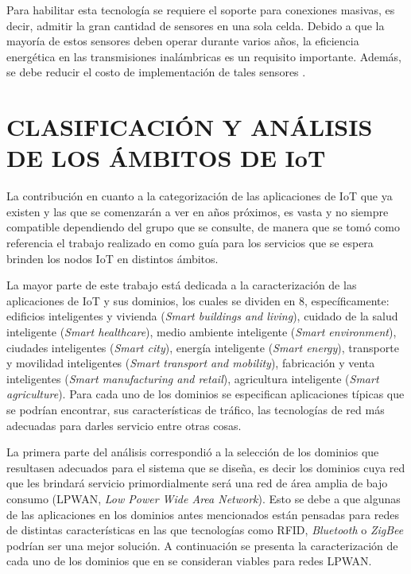 Para habilitar esta tecnología se requiere el soporte para conexiones masivas, es decir, admitir la gran cantidad de sensores en una sola celda. Debido a que la mayoría de estos sensores deben operar durante varios años, la eficiencia energética en las transmisiones inalámbricas es un requisito importante. Además, se debe reducir el costo de implementación de tales sensores \parencite{IoT5GWire}.


\section{CLASIFICACIÓN Y ANÁLISIS DE LOS ÁMBITOS DE IoT}

La contribución en cuanto a la categorización de las aplicaciones de IoT que ya existen y las que se comenzarán a ver en años próximos, es vasta y no siempre compatible dependiendo del grupo que se consulte, de manera que se tomó como referencia el trabajo realizado en \parencite{NetTrafficIoT} como guía para los servicios que se espera brinden los nodos IoT en distintos ámbitos.\newline

La mayor parte de este trabajo está dedicada a la caracterización de las aplicaciones de IoT y sus dominios, los cuales se dividen en 8, específicamente: edificios inteligentes y vivienda (\textit{Smart buildings and living}), cuidado de la salud inteligente (\textit{Smart healthcare}), medio ambiente inteligente (\textit{Smart environment}), ciudades inteligentes (\textit{Smart city}), energía inteligente (\textit{Smart energy}), transporte y movilidad  inteligentes (\textit{Smart transport and mobility}), fabricación y venta inteligentes (\textit{Smart manufacturing and retail}), agricultura inteligente (\textit{Smart agriculture}). Para cada uno de los dominios se especifican aplicaciones típicas que se podrían encontrar, sus características de tráfico, las tecnologías de red más adecuadas para darles servicio entre otras cosas.\newline

La primera parte del análisis correspondió a la selección de los dominios que resultasen adecuados para el sistema que se diseña, es decir los dominios cuya red que les brindará servicio primordialmente será una red de área amplia de bajo consumo (LPWAN, \textit{Low Power Wide Area Network}). Esto se debe a que algunas de las aplicaciones en los dominios antes mencionados están pensadas para redes de distintas características en las que tecnologías como RFID, \textit{Bluetooth }o \textit{ZigBee }podrían ser una mejor solución. A continuación se presenta la caracterización de cada uno de los dominios que en \parencite{NetTrafficIoT} se consideran viables para redes LPWAN.\newline

